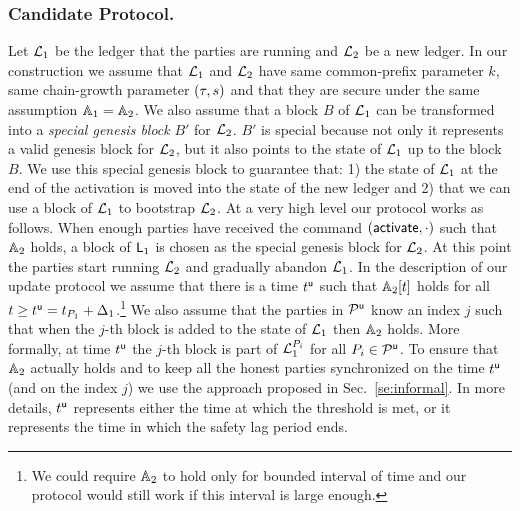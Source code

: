 \subsubsection{Candidate Protocol.}

Let $\mathcal{L}_1$ be the ledger that the parties are running and $\mathcal{L}_2$ be a new ledger.
In our construction we assume that $\mathcal{L}_1$ and $\mathcal{L}_2$ have same common-prefix parameter $k$, same chain-growth parameter $(\tau, s)$ and that they are secure under the same assumption $\mathbb{A}_1=\mathbb{A}_2$. We also assume that a block $B$ of $\mathcal{L}_1$ can be transformed into a \emph{special genesis block} $B'$ for $\mathcal{L}_2$. $B'$ is special because not only
it represents a valid genesis block for $\mathcal{L}_2$, but it also points to the state of $\mathcal{L}_1$ up to the block $B$. 
We use this special genesis block to guarantee that: 1) the state of $\mathcal{L}_1$ at the end of the activation is moved into the state of the new ledger
and 2) that we can use a block of $\mathcal{L}_1$ to bootstrap $\mathcal{L}_2$.
At a very high level our protocol works as follows. When enough parties have received the command $(\mathsf{activate},\cdot)$ such that $\mathbb{A}_2$ holds,
a block of $\mathsf{L}_1$ is chosen as the special genesis block for $\mathcal{L}_2$. At this point the parties start running $\mathcal{L}_2$ and gradually abandon 
$\mathcal{L}_1$.
In the description of our update protocol we assume that there is a time $t^{\mathsf{u}}$ such that $\mathbb{A}_2[t]$ holds for all $t\geq t^{\mathsf{u}}=t_{P_1}+\Delta_1$.\footnote{We could require $\mathbb{A}_2$ to
hold only for bounded interval of time and our protocol would still work if this interval is large enough.}
We also assume that the parties in $\mathcal{P}^\mathsf{u}$ know an index $j$ such that when the $j$-th block is added to the state of $\mathcal{L}_1$ then $\mathbb{A}_2$ holds. 
More formally, at time $t^{\mathsf{u}}$ the $j$-th block is part of $\mathcal{L}_1^{P_i}$ for all $P_i\in\mathcal{P}^\mathsf{u}$.
To ensure that $\mathbb{A}_2$ actually holds and to keep all the honest parties synchronized on the time $t^{\mathsf{u}}$ (and on the index $j$) we use the approach proposed in Sec.~\ref{se:informal}.
In more details, $t^{\mathsf{u}}$ represents either the time at which the threshold is met, or it represents the time in which the safety lag period ends.
 


